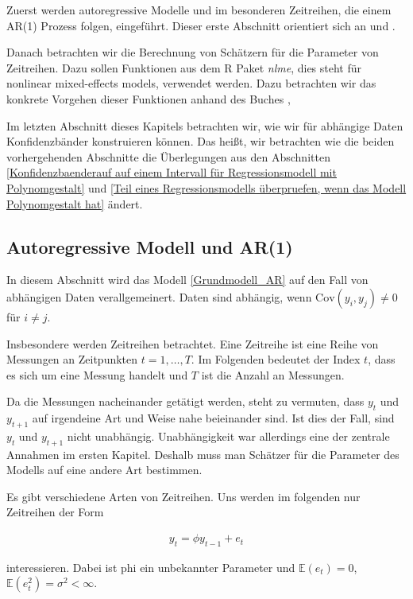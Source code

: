 \documentclass[12pt,a4paper]{article}
\theoremstyle{definition}
\theoremstyle{definition}
\theoremstyle{definition}
\theoremstyle{definition}
\begin{document}
Zuerst werden autoregressive Modelle und im besonderen Zeitreihen, die einem AR(1) Prozess folgen, eingeführt. Dieser erste Abschnitt orientiert sich an \cite{Hansen15} und \cite{Brockwell91}.

Danach betrachten wir die Berechnung von Schätzern für die Parameter von Zeitreihen. Dazu sollen Funktionen aus dem R Paket \textit{nlme}, dies steht für nonlinear mixed-effects models, verwendet werden. Dazu betrachten wir das konkrete Vorgehen dieser Funktionen anhand des Buches \cite{Pinheiro00},

Im letzten Abschnitt dieses Kapitels betrachten wir, wie wir für abhängige Daten Konfidenzbänder konstruieren können. Das heißt, wir betrachten wie die beiden vorhergehenden Abschnitte die Überlegungen aus den Abschnitten \ref{Konfidenzbaenderauf auf einem Intervall für Regressionsmodell mit Polynomgestalt} und \ref{Teil eines Regressionsmodells überpruefen, wenn das Modell Polynomgestalt hat} ändert.


\subsection{Autoregressive Modell und AR(1)}
\label{Regression für AR(1)}
In diesem Abschnitt wird das Modell \eqref{Grundmodell_AR} auf den Fall von abhängigen Daten verallgemeinert. Daten sind abhängig, wenn $\text{Cov}(y_i,y_j) \neq 0$ für $i \neq j$.

Insbesondere werden Zeitreihen betrachtet. Eine Zeitreihe ist eine Reihe von Messungen an Zeitpunkten $ t=1, \ldots, T $. Im Folgenden bedeutet der Index $t$, dass es sich um eine Messung handelt und $T$ ist die Anzahl an Messungen. 

Da die Messungen nacheinander getätigt werden, steht zu vermuten, dass $y_t$ und $y_{t+1}$ auf irgendeine Art und Weise nahe beieinander sind. Ist dies der Fall, sind $y_t$ und $y_{t+1}$ nicht unabhängig. Unabhängigkeit war allerdings eine der zentrale Annahmen im ersten Kapitel. Deshalb muss man Schätzer für die Parameter des Modells auf eine andere Art bestimmen.

Es gibt verschiedene Arten von Zeitreihen. Uns werden im folgenden nur Zeitreihen der Form 

\begin{align}
y_t = \phi y_{t-1} + e_t
\end{align}

interessieren. Dabei ist \gls{phi} ein unbekannter Parameter und $\mathbb{E}(e_t)=0$, $\mathbb{E}(e_t^2)=\sigma^2 < \infty$.
\end{document}
